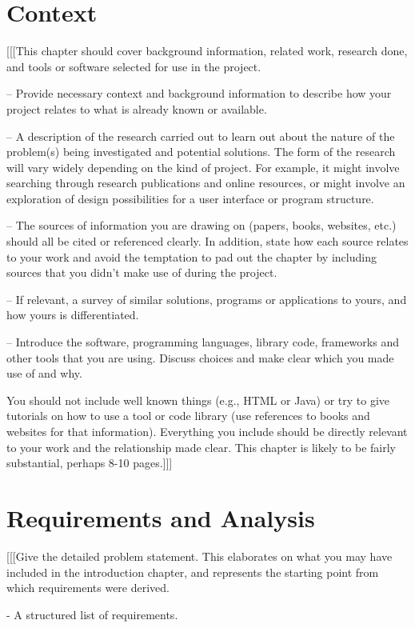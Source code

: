 \documentclass{report}
\begin{document}
\chapter{Context}

[[[This chapter should cover background information, related work, research done, and tools or software selected for use in the project.

– Provide necessary context and background information to describe how your project relates to what is already known or available.

– A description of the research carried out to learn out about the nature of the problem(s) being investigated and potential solutions. The form of the research will vary widely depending on the kind of project. For example, it might involve searching through research publications and online resources, or might involve an exploration of design possibilities for a user interface or program structure.

– The sources of information you are drawing on (papers, books, websites, etc.) should all be cited or referenced clearly. In addition, state how each source relates to your work and avoid the temptation to pad out the chapter by including sources that you didn’t make use of during the project.

– If relevant, a survey of similar solutions, programs or applications to yours, and how yours is differentiated.

– Introduce the software, programming languages, library code, frameworks and other tools that you are using. Discuss choices and make clear which you made use of and why.

You should not include well known things (e.g., HTML or Java) or try to give tutorials on how to use a tool or code library (use references to books and websites for that information). Everything you include should be directly relevant to your work and the relationship made clear. This chapter is likely to be fairly substantial, perhaps 8-10 pages.]]] 


\chapter{Requirements and Analysis}

[[[Give the detailed problem statement. This elaborates on what you may have included in the introduction chapter, and represents the starting point from which requirements were derived.

- A structured list of requirements.
\end{document}
